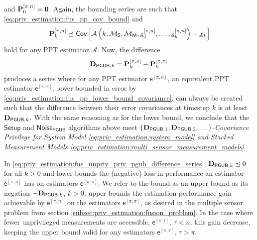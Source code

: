 and ${{\mathbf{P}}}_0^{[\pi,n]} = {{\mathbf{0}}}$. Again, the bounding series are such that \eqref{eq:priv_estimation:fus_pp_cov_bound} and
\begin{equation}\label{eq:priv_estimation:fus_pn_cov_bound}
    {\ensuremath{{\mathbf{P}}}}_k^{[\pi,n]} \preceq \mathsf{Cov}\left[\mathcal{A}\left(k,\mathcal{M}_{\mathsf{S}},\mathcal{M}_{\mathsf{M}},{\underline{z}}_1^{[\pi,n]},\dots,{\underline{z}}_k^{[\pi,n]}\right) - {\underline{x}}_k\right]
\end{equation}
hold for any PPT estimator $\mathcal{A}$. Now, the difference
\begin{equation}\label{eq:priv_estimation:fus_unpriv_priv_pgub_difference_series}
  {\ensuremath{{\mathbf{D}}}}_{\mathsf{PGUB},k} = {{\mathbf{P}}}_k^{[\pi,n]} - {{\mathbf{P}}}_k^{[\pi,\pi]}\,
\end{equation}
produces a series where for any PPT estimator $\mathsf{e}^{[\pi,n]}$, an equivalent PPT estimator $\mathsf{e}^{[\pi,\pi]}$, lower bounded in error by \eqref{eq:priv_estimation:fus_pp_lower_bound_covariance}, can always be created such that the difference between their error covariances at timestep $k$ is at least ${{\mathbf{D}}}_{\mathsf{PGUB},k}$. With the same reasoning as for the lower bound, we conclude that the $\mathsf{Setup}$ and $\mathsf{Noise}_{\mathsf{PGUB}}$ algorithms above meet \textit{$\{{{\mathbf{D}}}_{\mathsf{PGUB},1},{{\mathbf{D}}}_{\mathsf{PGUB},2},\dots\}$-Covariance Privilege for System Model \ref{eq:priv_estimation:system_model} and Stacked Measurement Models \ref{eq:priv_estimation:multi_sensor_measurement_models}}.

In \eqref{eq:priv_estimation:fus_unpriv_priv_pgub_difference_series}, ${{\mathbf{D}}}_{\mathsf{PGUB},k} \preceq 0$ for all $k>0$ and lower bounds the (negative) loss in performance an estimator $\mathsf{e}^{[\pi,n]}$ has on estimators $\mathsf{e}^{[\pi,\pi]}$. We refer to the bound as an upper bound as its negation $-{{\mathbf{D}}}_{\mathsf{PGUB},k}$, $k>0$, upper bounds the estimation performance gain achievable by $\mathsf{e}^{[\pi,n]}$ on the estimators $\mathsf{e}^{[\pi,\pi]}$, as desired in the multiple sensor problem from section \ref{subsec:priv_estimation:fusion_problem}. In the case where fewer unprivileged measurements are accessible, $\mathsf{e}^{[\pi,\tau]}$, $\tau<n$, this gain decrease, keeping the upper bound valid for any estimators $\mathsf{e}^{[\pi,\tau]}$, $\tau>\pi$.

% 
% 

